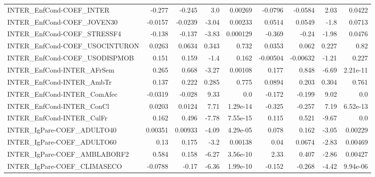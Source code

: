 \begin{tabular}{lrrrrrrrr}
INTER\_EnfCond-COEF\_INTER              &      -0.277 &       -0.245 &      3.0 &  0.00269 &    -0.0796 &     -0.0584 &         2.03 &        0.0422 \\
INTER\_EnfCond-COEF\_JOVEN30            &     -0.0157 &      -0.0239 &    -3.04 &  0.00233 &     0.0514 &      0.0549 &         -1.8 &        0.0713 \\
INTER\_EnfCond-COEF\_STRESSF4           &      -0.138 &       -0.137 &    -3.83 & 0.000129 &     -0.369 &       -0.24 &        -1.98 &        0.0476 \\
INTER\_EnfCond-COEF\_USOCINTURON        &      0.0263 &       0.0634 &    0.343 &    0.732 &     0.0353 &       0.062 &        0.227 &          0.82 \\
INTER\_EnfCond-COEF\_USODISPMOB         &       0.151 &        0.159 &     -1.4 &    0.162 &   -0.00504 &    -0.00632 &        -1.21 &         0.227 \\
INTER\_EnfCond-INTER\_AFrSem            &       0.265 &        0.668 &    -3.27 &  0.00108 &      0.177 &       0.848 &        -6.69 &      2.21e-11 \\
INTER\_EnfCond-INTER\_AmbTr             &       0.137 &        0.222 &    0.285 &    0.775 &     0.0894 &       0.203 &        0.304 &         0.761 \\
INTER\_EnfCond-INTER\_ComAfec           &     -0.0319 &       -0.028 &     9.33 &      0.0 &     -0.172 &      -0.199 &         9.02 &           0.0 \\
INTER\_EnfCond-INTER\_ConCl             &      0.0203 &       0.0124 &     7.71 & 1.29e-14 &     -0.325 &      -0.257 &         7.19 &      6.52e-13 \\
INTER\_EnfCond-INTER\_CulFr             &       0.162 &        0.496 &    -7.78 & 7.55e-15 &      0.115 &       0.521 &        -9.67 &           0.0 \\
INTER\_IgPare-COEF\_ADULTO40            &     0.00351 &      0.00933 &    -4.09 & 4.29e-05 &      0.078 &       0.162 &        -3.05 &       0.00229 \\
INTER\_IgPare-COEF\_ADULTO60            &        0.13 &        0.175 &     -3.2 &  0.00138 &       0.04 &      0.0674 &        -2.83 &       0.00469 \\
INTER\_IgPare-COEF\_AMBLABORF2          &       0.584 &        0.158 &    -6.27 & 3.56e-10 &       2.33 &       0.407 &        -2.86 &       0.00427 \\
INTER\_IgPare-COEF\_CLIMASECO           &     -0.0788 &        -0.17 &    -6.36 & 1.99e-10 &     -0.152 &      -0.268 &        -4.42 &      9.94e-06 \\

\end{tabular}
